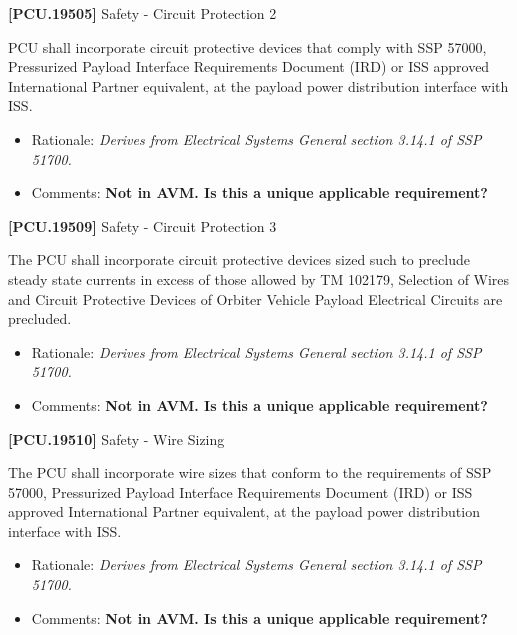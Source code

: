 \textbf{[PCU.19505]} Safety - Circuit Protection 2

\gls{PCU} shall incorporate circuit protective devices that comply with SSP 57000, Pressurized Payload Interface Requirements Document (IRD) or \gls{ISS} approved International Partner equivalent, at the payload power distribution interface with \gls{ISS}.

\begin{itemize}
\item{} Rationale: \emph{Derives from Electrical Systems General section 3.14.1 of SSP 51700.}

\item{} Comments: \textbf{Not in AVM. Is this a unique applicable requirement?}

\end{itemize}

\textbf{[PCU.19509]} Safety - Circuit Protection 3

The \gls{PCU} shall incorporate circuit protective devices sized such to preclude steady state currents in excess of those allowed by TM 102179, Selection of Wires and Circuit Protective Devices of Orbiter Vehicle Payload Electrical Circuits are precluded.

\begin{itemize}
\item{} Rationale: \emph{Derives from Electrical Systems General section 3.14.1 of SSP 51700.}

\item{} Comments: \textbf{Not in AVM. Is this a unique applicable requirement?}

\end{itemize}

\textbf{[PCU.19510]} Safety - Wire Sizing

The \gls{PCU} shall incorporate wire sizes that conform to the requirements of SSP 57000, Pressurized Payload Interface Requirements Document (IRD) or \gls{ISS} approved International Partner equivalent, at the payload power distribution interface with \gls{ISS}.

\begin{itemize}
\item{} Rationale: \emph{Derives from Electrical Systems General section 3.14.1 of SSP 51700.}

\item{} Comments: \textbf{Not in AVM. Is this a unique applicable requirement?}

\end{itemize}

